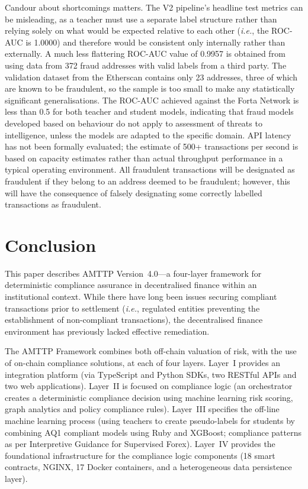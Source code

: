 \documentclass[journal]{IEEEtran}
\newcommand{\ie}{\textit{i.e.}}
\begin{document}
Candour about shortcomings matters. The V2 pipeline's headline test metrics can be misleading, as a teacher must use a separate label structure rather than relying solely on what would be expected relative to each other (\ie, the ROC-AUC is 1.0000) and therefore would be consistent only internally rather than externally. A much less flattering ROC-AUC value of 0.9957 is obtained from using data from 372 fraud addresses with valid labels from a third party. The validation dataset from the Etherscan contains only 23 addresses, three of which are known to be fraudulent, so the sample is too small to make any statistically significant generalisations. The ROC-AUC achieved against the Forta Network is less than 0.5 for both teacher and student models, indicating that fraud models developed based on behaviour do not apply to assessment of threats to intelligence, unless the models are adapted to the specific domain. API latency has not been formally evaluated; the estimate of 500+ transactions per second is based on capacity estimates rather than actual throughput performance in a typical operating environment. All fraudulent transactions will be designated as fraudulent if they belong to an address deemed to be fraudulent; however, this will have the consequence of falsely designating some correctly labelled transactions as fraudulent.

\section{Conclusion}

This paper describes AMTTP Version~4.0---a four-layer framework for deterministic compliance assurance in decentralised finance within an institutional context. While there have long been issues securing compliant transactions prior to settlement (\ie, regulated entities preventing the establishment of non-compliant transactions), the decentralised finance environment has previously lacked effective remediation.

The AMTTP Framework combines both off-chain valuation of risk, with the use of on-chain compliance solutions, at each of four layers. Layer~I provides an integration platform (via TypeScript and Python SDKs, two RESTful APIs and two web applications). Layer~II is focused on compliance logic (an orchestrator creates a deterministic compliance decision using machine learning risk scoring, graph analytics and policy compliance rules). Layer~III specifies the off-line machine learning process (using teachers to create pseudo-labels for students by combining AQ1 compliant models using Ruby and XGBoost; compliance patterns as per Interpretive Guidance for Supervised Forex). Layer~IV provides the foundational infrastructure for the compliance logic components (18 smart contracts, NGINX, 17 Docker containers, and a heterogeneous data persistence layer).
\end{document}
